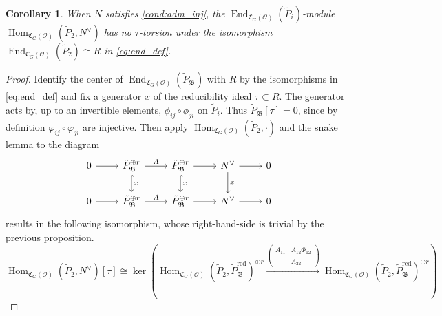 \documentclass[leqno]{amsart}
\newcommand{\smat}[1]{\left( \begin{smallmatrix} #1 \end{smallmatrix} \right)}
\DeclareMathOperator{\red}{red}
\newcommand{\oo}{\mathcal O}
\newcommand{\1}{\mathbf{1}}
\newcommand{\fC}{\mathfrak C}
\newcommand{\B}{\mathfrak B}
\DeclareMathOperator{\End}{End}
\DeclareMathOperator{\Hom}{Hom}
\newtheorem{cor}[thm]{Corollary}
\theoremstyle{definition}
\theoremstyle{remark}
\begin{document}
\begin{cor}
	When $N$ satisfies \eqref{cond:adm_inj},
	the $\End_{\fC_{G}(\oo)}(\tilde{P}_i)$-module
	$\Hom_{\fC_G(\oo)}(\tilde{P}_2, N^\vee)$
	has no $\tau$-torsion 
	under the isomorphism $\End_{\fC_{G}(\oo)}(\tilde{P}_2)\cong R$
	in \eqref{eq:end_def}.
\end{cor}
\begin{proof}
	Identify the center of $\End_{\fC_{G}(\oo)}(\tilde{P}_\B)$ 
	with $R$ by the isomorphisms
	in \eqref{eq:end_def}
	and fix a generator $x$ of the reducibility ideal  $\tau\subset R$.
	The generator acts by, up to an invertible elements,
	$\phi_{ij}\circ\phi_{ji}$ on $\tilde{P}_i$.
	Thus $\tilde{P}_\B[\tau]=0$,
	since by definition $\varphi_{ij}\circ\varphi_{ji}$ are injective.
	Then apply 
	$\Hom_{\fC_G(\oo)}(\tilde{P}_2,\cdot)$
	and the snake lemma to the diagram
    \begin{equation*}
    \begin{tikzcd}
        0 \arrow[r] & \tilde{P}_\B^{\oplus r} 
	\arrow[d,"x",hookrightarrow] \arrow[r,"A"] & 
	\tilde{P}_\B^{\oplus r} 
	\arrow[d,"x",hookrightarrow] \arrow[r] & 
	N^\vee \arrow[d,"x"] \arrow[r] & 0 \\ 
        0 \arrow[r] & \tilde{P}_\B^{\oplus r}
	\arrow[r,"A"] & \tilde{P}_\B^{\oplus r}
	\arrow[r] &N^\vee  \arrow[r] & 0 
    \end{tikzcd}
\end{equation*}
results in the following isomorphism,
whose right-hand-side
is trivial by the previous proposition.
\[
\Hom_{\fC_G(\oo)}(\tilde{P}_2, N^\vee)[\tau]\cong 
\ker\left(
	\Hom_{\fC_G(\oo)}(\tilde{P}_2, \tilde{P}_\B^{\red})^{\oplus r}
\xrightarrow{\smat{\bar{A}_{11}& \bar{A}_{12}\Phi_{12}\\& \bar{A}_{22}}}
\Hom_{\fC_G(\oo)}(\tilde{P}_2, \tilde{P}_\B^{\red})^{\oplus r} \right)
\]\qedhere
\end{proof}
\end{document}
